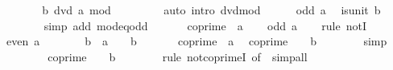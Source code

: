 \begin{isabellebody}
\ \ \ \ \isamarkupfalse%
\ \isamarkupfalse%
\ {\isachardoublequoteopen}b\ dvd\ a\ mod\ {}{\isachardoublequoteclose}\isanewline
\ \ \ \ \ \ \isamarkupfalse%
\ {\isacharparenleft}{\kern0pt}auto\ intro{\isacharcolon}{\kern0pt}\ dvd{\isacharunderscore}{\kern0pt}mod{\isacharparenright}{\kern0pt}\isanewline
\ \ \ \ \isamarkupfalse%
\ {\isacartoucheopen}odd\ a{\isacartoucheclose}\ \isamarkupfalse%
\ {\isachardoublequoteopen}is{\isacharunderscore}{\kern0pt}unit\ b{\isachardoublequoteclose}\isanewline
\ \ \ \ \ \ \isamarkupfalse%
\ {\isacharparenleft}{\kern0pt}simp\ add{\isacharcolon}{\kern0pt}\ mod{\isacharunderscore}{\kern0pt}{}{\isacharunderscore}{\kern0pt}eq{\isacharunderscore}{\kern0pt}odd{\isacharparenright}{\kern0pt}\isanewline
\ \ \isamarkupfalse%
\isanewline
{}\isamarkupfalse%
\isanewline
\ \ \isamarkupfalse%
\ {\isachardoublequoteopen}coprime\ {}\ a{\isachardoublequoteclose}\isanewline
\ \ \isamarkupfalse%
\ {\isachardoublequoteopen}odd\ a{\isachardoublequoteclose}\isanewline
\ \ \isamarkupfalse%
\ {\isacharparenleft}{\kern0pt}rule\ notI{\isacharparenright}{\kern0pt}\isanewline
\ \ \ \ \isamarkupfalse%
\ {\isachardoublequoteopen}even\ a{\isachardoublequoteclose}\isanewline
\ \ \ \ \isamarkupfalse%
\ \isamarkupfalse%
\ b\ \ {\isachardoublequoteopen}a\ {\isacharequal}{\kern0pt}\ {}\ {\isacharasterisk}{\kern0pt}\ b{\isachardoublequoteclose}\ \isacommand{{\isachardot}{\kern0pt}{\isachardot}{\kern0pt}}\isamarkupfalse%
\isanewline
\ \ \ \ \isamarkupfalse%
\ {\isacartoucheopen}coprime\ {}\ a{\isacartoucheclose}\ \isamarkupfalse%
\ {\isachardoublequoteopen}coprime\ {}\ {\isacharparenleft}{\kern0pt}{}\ {\isacharasterisk}{\kern0pt}\ b{\isacharparenright}{\kern0pt}{\isachardoublequoteclose}\isanewline
\ \ \ \ \ \ \isamarkupfalse%
\ simp\isanewline
\ \ \ \ \isamarkupfalse%
\ \isamarkupfalse%
\ {\isachardoublequoteopen}{\isasymnot}\ coprime\ {}\ {\isacharparenleft}{\kern0pt}{}\ {\isacharasterisk}{\kern0pt}\ b{\isacharparenright}{\kern0pt}{\isachardoublequoteclose}\isanewline
\ \ \ \ \ \ \isamarkupfalse%
\ {\isacharparenleft}{\kern0pt}rule\ not{\isacharunderscore}{\kern0pt}coprimeI\ {\isacharbrackleft}{\kern0pt}of\ {}{\isacharbrackright}{\kern0pt}{\isacharparenright}{\kern0pt}\ simp{\isacharunderscore}{\kern0pt}all\isanewline

\end{isabellebody}
